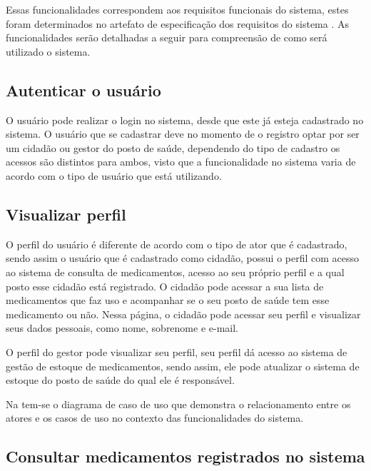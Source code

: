 Essas funcionalidades correspondem aos requisitos funcionais do sistema, estes foram determinados no artefato de especificação dos requisitos do sistema . As funcionalidades serão detalhadas a seguir para compreensão de como será utilizado o sistema.

\subsection{Autenticar o usuário}

O usuário pode realizar o login no sistema, desde que este já esteja cadastrado no sistema. O usuário que se cadastrar deve no momento de o registro optar por ser um cidadão ou gestor do posto de saúde, dependendo do tipo de cadastro os acessos são distintos para ambos, visto que a funcionalidade no sistema varia de acordo com o tipo de usuário que está utilizando.

\subsection{Visualizar perfil}

O perfil do usuário é diferente de acordo com o tipo de ator que é cadastrado, sendo assim o usuário que é cadastrado como cidadão, possui o perfil com acesso ao sistema de consulta de medicamentos, acesso ao seu próprio perfil e a qual posto esse cidadão está registrado. O cidadão pode acessar a sua lista de medicamentos que faz uso e acompanhar se o seu posto de saúde tem esse medicamento ou não.
Nessa página, o cidadão pode acessar seu perfil e visualizar seus dados pessoais, como nome, sobrenome e e-mail.

O perfil do gestor pode visualizar seu perfil, seu perfil dá acesso ao sistema de gestão de estoque de medicamentos, sendo assim, ele pode atualizar o sistema de estoque do posto de saúde do qual ele é responsável.

Na  tem-se o diagrama de caso de uso que demonstra o relacionamento entre os atores e os casos de uso no contexto das funcionalidades do sistema.


%

\subsection{Consultar medicamentos registrados no sistema}

